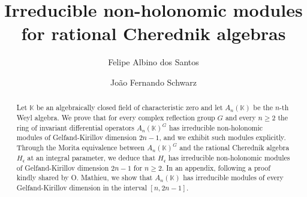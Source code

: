 \documentclass[12pt, a4paper]{amsart}
\title{Irreducible non-holonomic modules for rational Cherednik algebras}
\author{Felipe Albino dos Santos \and João Fernando Schwarz}
\newcommand{\joao}[1]{{\color{blue} #1}}
\newcommand{\discuss}[1]{{\color{orange} \textbf{[CHECK/DOUBT: #1]}}}
\begin{document}
\begin{abstract}
Let $\mathbb{K}$ be an algebraically closed field of characteristic zero and let
$A_n(\mathbb{K})$ be the $n$-th Weyl algebra. We prove that for every complex
reflection group $G$ and every $n \geq 2$ the ring of invariant differential
operators $A_n(\mathbb{K})^G$ has irreducible non-holonomic modules of
Gelfand-Kirillov dimension $2n-1$, and we exhibit such modules explicitly.
Through the Morita equivalence between $A_n(\mathbb{K})^G$ and the rational
Cherednik algebra $H_{\mathfrak c}$ at an integral parameter, we deduce that
$H_{\mathfrak c}$ has irreducible non-holonomic modules of Gelfand-Kirillov
dimension $2n-1$ for $n \geq 2$. In an appendix, following a proof kindly shared by O. Mathieu, we show
that $A_n(\mathbb{K})$ has irreducible modules of every Gelfand-Kirillov
dimension in the interval $[n, 2n-1]$.
\end{abstract}


\maketitle
\end{document}
